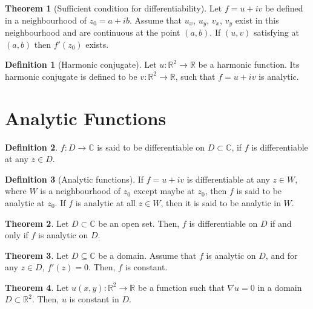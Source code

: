 \documentclass[titlepage, fleqn, a4paper, 12pt, twoside]{article}
\theoremstyle{definition}
\newtheorem{definition}{Definition}
\theoremstyle{theorem}
\newtheorem{theorem}{Theorem}
\begin{document}
\begin{theorem}[Sufficient condition for differentiability]
	Let $f = u + i v$ be defined in a neighbourhood of $z_0 = a + i b$.
	Assume that $u_x$, $u_y$, $v_x$, $v_y$ exist in this neighbourhood and are continuous at the point $(a,b)$.
	If $(u,v)$ satisfying  at $(a,b)$ then $f'(z_0)$ exists.
\end{theorem}

\begin{definition}[Harmonic conjugate]
	Let $u : \mathbb{R}^2 \to \mathbb{R}$ be a harmonic function.
	Its harmonic conjugate is defined to be $v : \mathbb{R}^2 \to \mathbb{R}$, such that $f = u + i v$ is analytic.
\end{definition}

\section{Analytic Functions}

\begin{definition}
	$f : D \to \mathbb{C}$ is said to be differentiable on $D \subset \mathbb{C}$, if $f$ is differentiable at any $z \in D$.
\end{definition}

\begin{definition}[Analytic functions]
	If $f = u + i v$ is differentiable at any $z \in W$, where $W$ is a neighbourhood of $z_0$ except maybe at $z_0$, then $f$ is said to be analytic at $z_0$.
	If $f$ is analytic at all $z \in W$, then it is said to be analytic in $W$.
\end{definition}

\begin{theorem}
	Let $D \subset \mathbb{C}$ be an open set.
	Then, $f$ is differentiable on $D$ if and only if $f$ is analytic on $D$.
\end{theorem}

\begin{theorem}
	Let $D \subseteq \mathbb{C}$ be a domain.
	Assume that $f$ is analytic on $D$, and for any $z \in D$, $f'(z) = 0$.
	Then, $f$ is constant.
\end{theorem}

\begin{theorem}
	Let $u(x,y) : \mathbb{R}^2 \to \mathbb{R}$ be a function such that $\nabla u = 0$ in a domain $D \subset \mathbb{R}^2$.
	Then, $u$ is constant in $D$.
\end{theorem}
\end{document}

